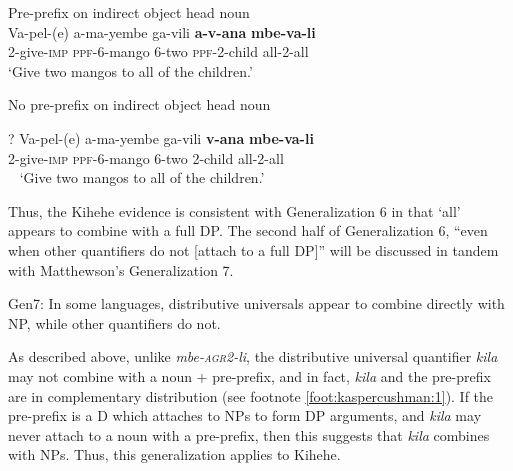 \documentclass[output=paper,modfonts,nonflat]{langsci/langscibook}
\begin{document}
\begin{exe} 

\ex  \label{ex:kaspercushman:mango} \begin{xlist}

\ex Pre-prefix on indirect object head noun \\

\gll Va-pel-(e) a-ma-yembe ga-vili \textbf{a-v-ana} \textbf{mbe-va-li} \\
2-give-\textsc{imp} \textsc{ppf}-6-mango 6-two \textsc{ppf}-2-child all-2-all\\ 
\vspace{-1.25ex}
\glt `Give two mangos to all of the children.' \\ \label{yesppfio} 



\ex No pre-prefix on indirect object head noun \

\gll ? Va-pel-(e) a-ma-yembe ga-vili \textbf{v-ana} \textbf{mbe-va-li} \\
{} 2-give-\textsc{imp} \textsc{ppf}-6-mango 6-two 2-child all-2-all\\ \label{ex:kaspercushman:noppfio}\
\vspace{-1.25ex}
\glt `Give two mangos to all of the children.'

\end{xlist}
\end{exe}

Thus, the Kihehe evidence is consistent with Generalization 6 in that `all' appears to combine with a full DP.  The second half of Generalization 6, ``even when other quantifiers do not [attach to a full DP]'' will be discussed in tandem with Matthewson's Generalization 7. 


\begin{exe}

\ex Gen7: In some languages, distributive universals appear to combine directly with NP, while other quantifiers do not. \cite[36]{matthewson13} \\
\end{exe}

As described above, unlike \textit{mbe-\textsc{agr2}-li}, the distributive universal quantifier \textit{kila} may not combine with a noun + pre-prefix, and in fact, \textit{kila} and the pre-prefix are in complementary distribution (see footnote \ref{foot:kaspercushman:1}). If the pre-prefix is a D which attaches to NPs to form DP arguments, and \textit{kila} may never attach to a noun with a pre-prefix, then this suggests that \textit{kila} combines with NPs. Thus, this generalization applies to Kihehe. 
\end{document}
